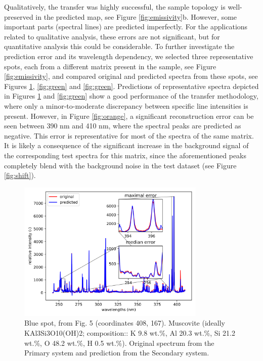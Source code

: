 \documentclass[preprint,11pt]{elsarticle}
\begin{document}
Qualitatively, the transfer was highly successful, the sample topology is well-preserved in the predicted map, see Figure \ref{fig:emissivity}b. However, some important parts (spectral lines) are predicted imperfectly. For the applications related to qualitative analysis, these errors are not significant, but for quantitative analysis this could be considerable. To further investigate the prediction error and its wavelength dependency, we selected three representative spots, each from a different matrix present in the sample, see Figure \ref{fig:emissivity}, and compared original and predicted spectra from these spots, see Figures \ref{fig:blue}, \ref{fig:green} and \ref{fig:green}. Predictions of representative spectra depicted in Figures \ref{fig:blue} and \ref{fig:green} show a good performance of the transfer methodology, where only a minor-to-moderate discrepancy between specific line intensities is present. However, in Figure \ref{fig:orange}, a significant reconstruction error can be seen between 390 nm and 410 nm, where the spectral peaks are predicted as negative. This error is representative for most of the spectra of the same matrix. It is likely a consequence of the significant increase in the background signal of the corresponding test spectra for this matrix, since the aforementioned peaks completely blend with the background noise in the test dataset (see Figure \ref{fig:shift}).

\begin{figure}[!htb]
    \centering
    \includegraphics[width=0.8\textwidth]{spectra_sample_blue.png}
    \caption{Blue spot,  from Fig. 5 (coordinates 408, 167). Muscovite (ideally KAl3Si3O10(OH)2; composition:: K 9.8 wt.\%, Al 20.3 wt.\%, Si 21.2 wt.\%, O 48.2 wt.\%, H 0.5 wt.\%). Original spectrum from the Primary system and prediction from the Secondary system.}
    \label{fig:blue}
\end{figure}
\end{document}
